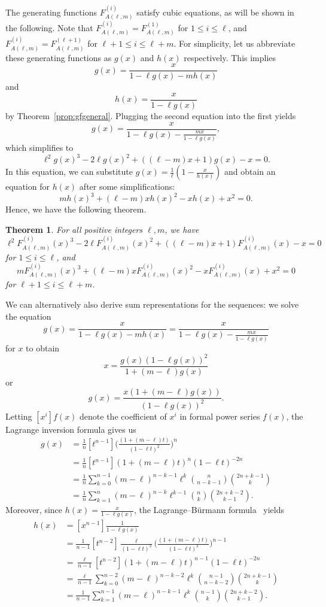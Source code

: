 \documentclass[12pt]{amsart}
\newtheorem{theorem}{Theorem}
\begin{document}
The generating functions $F_{A(\ell,m)}^{(i)}$ satisfy cubic equations, as will be shown in the following. 
Note that $F_{A(\ell,m)}^{(i)} = F_{A(\ell,m)}^{(1)}$ for $1 \leq i \leq \ell$, and $F_{A(\ell,m)}^{(i)} = F_{A(\ell,m)}^{(\ell+1)}$ for $\ell+1 \leq i \leq \ell+m$. For simplicity, let us abbreviate these generating functions as $g(x)$ and $h(x)$ respectively. This implies 
\[g(x) = \frac{x}{1-\ell g(x) - m h(x)}\]
and
\[h(x) = \frac{x}{1-\ell g(x)}\]
by Theorem~\ref{prop:gfgeneral}.
Plugging the second equation into the first yields
\[g(x) = \frac{x}{1-\ell g(x) - \frac{m x}{1-\ell g(x)}},\]
which simplifies to
\[\ell^2 g(x)^3 - 2\ell g(x)^2 + ((\ell-m)x+1) g(x) - x = 0.\]
In this equation, we can substitute $g(x) = \frac{1}{\ell} (1 - \frac{x}{h(x)})$
and obtain an equation for $h(x)$ after some simplifications:
\[m h(x)^3 + (\ell-m)x h(x)^2 - x h(x) + x^2 = 0.\]
Hence, we have the following theorem.

\begin{theorem}\label{thm:removesquare-gfs}
For all positive integers $\ell,m$, we have
$$\ell^2 F_{A(\ell,m)}^{(i)}(x)^3 - 2\ell F_{A(\ell,m)}^{(i)}(x)^2 + ((\ell-m)x+1) F_{A(\ell,m)}^{(i)}(x) - x = 0$$
for $1 \leq i \leq \ell$, and
$$ m F_{A(\ell,m)}^{(i)}(x)^3 + (\ell-m)x F_{A(\ell,m)}^{(i)}(x)^2 - x F_{A(\ell,m)}^{(i)}(x) + x^2 = 0$$
for $\ell + 1 \leq i \leq \ell + m$.
\end{theorem}

We can alternatively also derive  sum representations for the sequences: we solve the equation
$$g(x) = \frac{x}{1-\ell g(x) - m h(x)} = \frac{x}{1-\ell g(x) - \frac{mx}{1-\ell g(x)}}$$
for $x$ to obtain
$$x = \frac{g(x)(1-\ell g(x))^2}{1 + (m-\ell)g(x)}$$
or
$$g(x) = \frac{x(1+(m-\ell)g(x))}{(1-\ell g(x))^2}.$$
Letting $[x^i]f(x)$ denote the coefficient of $x^i$ in formal power series $f(x)$, the Lagrange inversion formula gives us
\begin{align*}
[x^n] g(x) &= \frac{1}{n} [t^{n-1}] \Big( \frac{(1+(m-\ell)t)}{(1-\ell t)^2} \Big)^n \\
&= \frac{1}{n} [t^{n-1}] (1+(m-\ell)t)^n (1-\ell t)^{-2n} \\
&= \frac{1}{n} \sum_{k=0}^{n-1} (m-\ell)^{n-k-1} \ell^k \binom{n}{n-k-1} \binom{2n+k-1}{k} \\
&= \frac{1}{n} \sum_{k=1}^{n} (m-\ell)^{n-k} \ell^{k-1} \binom{n}{k} \binom{2n+k-2}{k-1}.
\end{align*}
Moreover, since $h(x) = \frac{x}{1-\ell g(x)}$, the Lagrange--B\"urmann formula~\cite[Corollary 5.4.3]{Stanley1999Enumerative} yields
\begin{align*}
[x^n] h(x) &= [x^{n-1}] \frac{1}{1- \ell g(x)} \\
&= \frac{1}{n-1} [t^{n-2}] \frac{\ell}{(1- \ell t)^2}
\Big( \frac{(1+(m-\ell)t)}{(1-\ell t)^2} \Big)^{n-1} \\
&= \frac{\ell}{n-1} [t^{n-2}] (1+(m-\ell)t)^{n-1} (1-\ell t)^{-2n} \\
&= \frac{\ell}{n-1} \sum_{k=0}^{n-2} (m-\ell)^{n-k-2} \ell^k \binom{n-1}{n-k-2} \binom{2n+k-1}{k} \\
&= \frac{1}{n-1} \sum_{k=1}^{n-1} (m-\ell)^{n-k-1} \ell^k \binom{n-1}{k} \binom{2n+k-2}{k-1}.
\end{align*}
\end{document}
